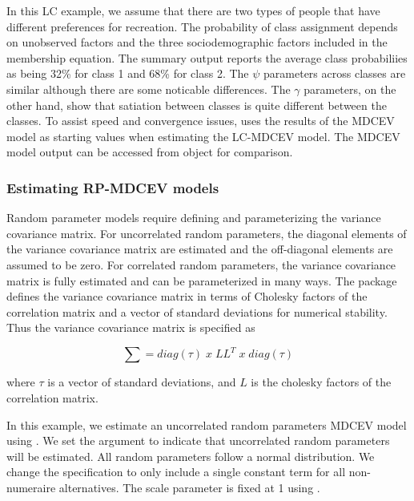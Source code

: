 In this LC example, we assume that there are two types of people that
have different preferences for recreation. The probability of class
assignment depends on unobserved factors and the three sociodemographic
factors included in the membership equation. The summary output reports
the average class probabiliies as being 32\% for class 1 and 68\% for
class 2. The \(\psi\) parameters across classes are similar although
there are some noticable differences. The \(\gamma\) parameters, on the
other hand, show that satiation between classes is quite different
between the classes. To assist speed and convergence issues,
 uses the results of the MDCEV model as starting values when
estimating the LC-MDCEV model. The MDCEV model output can be accessed
from  object for comparison.

\hypertarget{estimating-rp-mdcev-models}{%
\subsubsection{Estimating RP-MDCEV
models}\label{estimating-rp-mdcev-models}}

Random parameter models require defining and parameterizing the variance
covariance matrix. For uncorrelated random parameters, the diagonal
elements of the variance covariance matrix are estimated and the
off-diagonal elements are assumed to be zero. For correlated random
parameters, the variance covariance matrix is fully estimated and can be
parameterized in many ways. The  package defines the
variance covariance matrix in terms of Cholesky factors of the
correlation matrix and a vector of standard deviations for numerical
stability. Thus the variance covariance matrix is specified as

\begin{equation}
\sum = diag(\tau) \; x \; LL^T \; x \; diag(\tau)
\end{equation}

where \(\tau\) is a vector of standard deviations, and \(L\) is the
cholesky factors of the correlation matrix.

In this example, we estimate an uncorrelated random parameters MDCEV
model using . We set the argument
 to indicate that uncorrelated
random parameters will be estimated. All random parameters follow a
normal distribution. We change the  specification to only
include a single constant term for all non-numeraire alternatives. The
scale parameter is fixed at 1 using .

